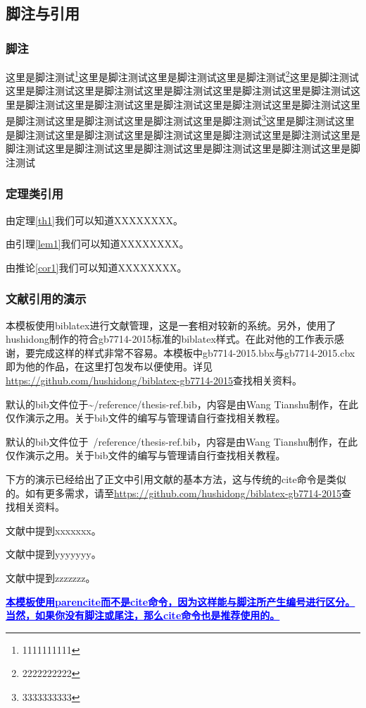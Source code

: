 \subsection{脚注与引用}

\subsubsection{脚注}

这里是脚注测试\footnote{1111111111}这里是脚注测试这里是脚注测试这里是脚注测试\footnote{2222222222}这里是脚注测试这里是脚注测试这里是脚注测试这里是脚注测试这里是脚注测试这里是脚注测试这里是脚注测试这里是脚注测试这里是脚注测试这里是脚注测试这里是脚注测试这里是脚注测试这里是脚注测试这里是脚注测试这里是脚注测试\footnote{3333333333}这里是脚注测试这里是脚注测试这里是脚注测试这里是脚注测试这里是脚注测试这里是脚注测试这里是脚注测试这里是脚注测试这里是脚注测试这里是脚注测试这里是脚注测试这里是脚注测试

\subsubsection{定理类引用}

由定理\ref{th1}我们可以知道XXXXXXXX。

由引理\ref{lem1}我们可以知道XXXXXXXX。

由推论\ref{cor1}我们可以知道XXXXXXXX。

\subsubsection{文献引用的演示}

本模板使用biblatex进行文献管理，这是一套相对较新的系统。另外，使用了hushidong制作的符合gb7714-2015标准的biblatex样式。在此对他的工作表示感谢，要完成这样的样式非常不容易。本模板中gb7714-2015.bbx与gb7714-2015.cbx即为他的作品，在这里打包发布以便使用。详见\url{https://github.com/hushidong/biblatex-gb7714-2015}查找相关资料。

默认的bib文件位于\textasciitilde{}/reference/thesis-ref.bib，内容是由Wang
Tianshu制作，在此仅作演示之用。关于bib文件的编写与管理请自行查找相关教程。

默认的bib文件位于~/reference/thesis-ref.bib，内容是由Wang Tianshu制作，在此仅作演示之用。关于bib文件的编写与管理请自行查找相关教程。

下方的演示已经给出了正文中引用文献的基本方法，这与传统的cite命令是类似的。如有更多需求，请至\url{https://github.com/hushidong/biblatex-gb7714-2015}查找相关资料。

文献\parencite{Wuwei:2013}中提到xxxxxxx。

文献\parencite{zhouxu:2019}中提到yyyyyyy。

文献\parencite{tang:2008}中提到zzzzzzz。

\textcolor{blue}{\textbf{\uline{本模板使用parencite而不是cite命令，因为这样能与脚注所产生编号进行区分。当然，如果你没有脚注或尾注，那么cite命令也是推荐使用的。}}}


\nocite{*}

